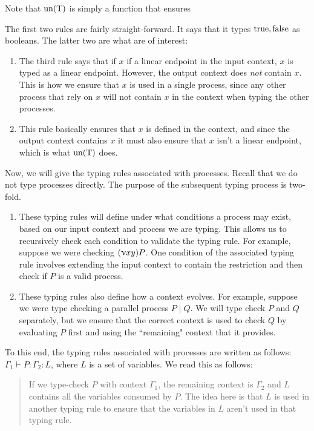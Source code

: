 Note that $\text{un(T)}$ is simply a function that ensures 

The first two rules are fairly straight-forward. It says that it types $\text{true}, \text{false}$ as booleans. The latter two are what are of interest:
\begin{enumerate}
\item The third rule says that if $x$ if a linear endpoint in the input context, $x$ is typed as a linear endpoint. However, the output context does \textit{not} contain $x$. This is how we ensure that $x$ is used in a single process, since any other process that rely on $x$ will not contain $x$ in the context when typing the other processes.
\item This rule basically ensures that $x$ is defined in the context, and since the output context contains $x$ it must also ensure that $x$ isn't a linear endpoint, which is what $\text{un(T)}$ does.
\end{enumerate}

Now, we will give the typing rules associated with processes. Recall that we do not type processes directly. The purpose of the subsequent typing process is two-fold.

\begin{enumerate}

\item These typing rules will define under what conditions a process may exist, based on our input context and process we are typing. This allows us to recursively check each condition to validate the typing rule. For example, suppose we were checking $(\upnu xy) P$. One condition of the associated typing rule involves extending the input context to contain the restriction and then check if $P$ is a valid process.  
\item These typing rules also define how a context evolves. For example, suppose we were type checking a parallel process $P \mid Q$. We will type check $P$ and $Q$ separately, but we ensure that the correct context is used to check $Q$ by evaluating $P$ first and using the ``remaining" context that it provides.
\end{enumerate}

To this end, the typing rules associated with processes are written as follows: $\Gamma_1 \vdash P : \Gamma_2 : L$, where $L$ is a set of variables. We read this as follows:
\begin{quote}
    If we type-check $P$ with context $\Gamma_1$, the remaining context is $\Gamma_2$ and $L$ contains all the variables consumed by $P$. The idea here is that $L$ is used in another typing rule to ensure that the variables in $L$ aren't used in that typing rule.
\end{quote}


